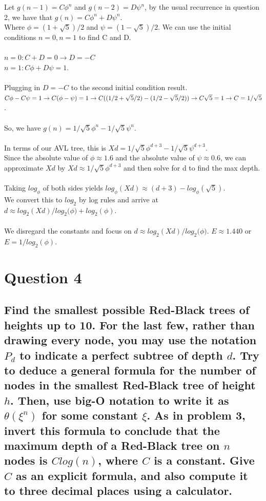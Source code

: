 \documentclass[11pt]{article}
\begin{document}
Let $g(n-1) = C\phi^n$ and $g(n-2) = D\psi^n$, by the usual recurrence in question 2, we have that $g(n) = C\phi^n + D\psi^n$. \\Where $\phi = (1+\sqrt 5)/2 $ and $\psi = (1-\sqrt 5)/2$. We can use the initial conditions $n=0, n=1$ to find C and D.\\
\\$ n=0: C + D = 0 \rightarrow D = -C$
\\$ n=1: C\phi + D\psi = 1$. \\\\Plugging in $D = -C$ to the second initial condition result.
$ C\phi -C\psi = 1 \\\rightarrow C(\phi - \psi) = 1 \rightarrow C((1/2 + \sqrt 5/2) - (1/2 - \sqrt 5/2)) \rightarrow C\sqrt 5 = 1 \\\rightarrow C = 1/{\sqrt 5}$.\\\\So, we have $g(n) = 1/{\sqrt 5}\phi^n - 1/{\sqrt 5}\psi^n$. \\\\In terms of our AVL tree, this is $Xd = 1/{\sqrt 5}\phi^{d+3} - 1/{\sqrt 5}\psi^{d+3}$. \\Since the absolute value of $\phi \approx 1.6 $ and the absolute value of $\psi \approx 0.6$, we can approximate $Xd$ by $Xd \approx 1/{\sqrt 5}\phi^{d+3}$ and then solve for d to find the max depth. \\\\Taking $log_\phi$ of both sides yields $log_\phi(Xd) \approx (d+3) - log_\phi(\sqrt 5 )$. \\We convert this to $log_2$ by log rules and arrive at $d \approx log_2(Xd)/{log_2(\phi}) + log_2(\phi)$. \\\\We disregard the constants and focus on $d \approx log_2(Xd)/{log_2(\phi})$. $ E \approx 1.440$ or $E = 1/{log_2(\phi)} $.

\section{Question 4}
\subsection{Find the smallest possible Red-Black trees of heights up to 10. For the last few, rather than drawing every node, you may use the notation $ P_d $ to indicate a perfect subtree of depth $ d $.  Try to deduce a general formula for the number of nodes in the smallest Red-Black tree of height $ h $. Then, use big-O notation to write it as $ \theta(\xi^n) $ for some constant $ \xi $. As in problem 3, invert this formula to conclude that the maximum depth of a Red-Black tree on $ n $ nodes is $ Clog(n) $, where $ C $ is a constant.  Give $ C $ as an explicit formula, and also compute it to three decimal places using a calculator.}
\end{document}
